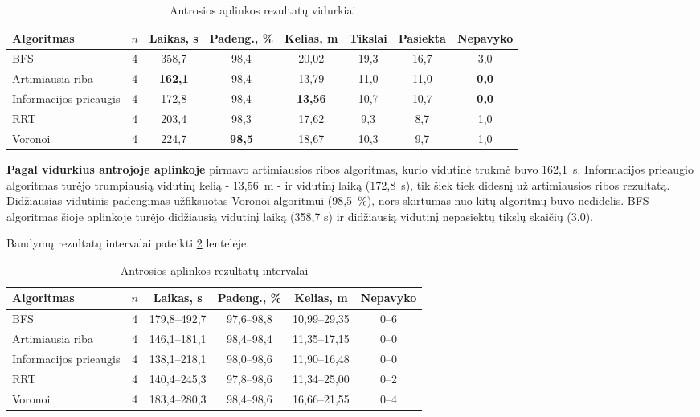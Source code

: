 \documentclass[]{VUMIFTemplateClass}
\begin{document}
\begin{table}[H]
\centering
\caption{Antrosios aplinkos rezultatų vidurkiai}
\label{tab:results-room2-avg}
\small
\setlength{\tabcolsep}{3pt}
\begin{tabular}{|l|c|c|c|c|c|c|c|}
\hline
\textbf{Algoritmas} & \textbf{$n$} & \textbf{Laikas, s} & \textbf{Padeng., \%} & \textbf{Kelias, m} & \textbf{Tikslai} & \textbf{Pasiekta} & \textbf{Nepavyko} \\
\hline
BFS & 4 & 358,7 & 98,4 & 20,02 & 19,3 & 16,7 & 3,0 \\
\hline
Artimiausia riba & 4 & \textbf{162,1} & 98,4 & 13,79 & 11,0 & 11,0 & \textbf{0,0} \\
\hline
Informacijos prieaugis & 4 & 172,8 & 98,4 & \textbf{13,56} & 10,7 & 10,7 & \textbf{0,0} \\
\hline
RRT & 4 & 203,4 & 98,3 & 17,62 & 9,3 & 8,7 & 1,0 \\
\hline
Voronoi & 4 & 224,7 & \textbf{98,5} & 18,67 & 10,3 & 9,7 & 1,0 \\
\hline
\end{tabular}
\end{table}

\textbf{Pagal vidurkius antrojoje aplinkoje} pirmavo artimiausios ribos algoritmas, kurio vidutinė trukmė buvo 162,1~s. Informacijos prieaugio algoritmas turėjo
trumpiausią vidutinį kelią - 13,56~m - ir vidutinį laiką (172,8~s), tik šiek tiek didesnį už artimiausios ribos rezultatą. Didžiausias vidutinis padengimas
užfiksuotas Voronoi algoritmui (98,5~\%), nors skirtumas nuo kitų algoritmų buvo nedidelis. BFS algoritmas šioje aplinkoje turėjo didžiausią vidutinį laiką (358,7 s) ir didžiausią vidutinį nepasiektų tikslų skaičių (3,0).

Bandymų rezultatų intervalai pateikti \ref{tab:results-room2-disp} lentelėje.

\begin{table}[H]
\centering
\caption{Antrosios aplinkos rezultatų intervalai}
\label{tab:results-room2-disp}
\small
\setlength{\tabcolsep}{3pt}
\begin{tabular}{|l|c|c|c|c|c|}
\hline
\textbf{Algoritmas} & \textbf{$n$} & \textbf{Laikas, s} & \textbf{Padeng., \%} & \textbf{Kelias, m} & \textbf{Nepavyko} \\
\hline
BFS & 4 & 179,8--492,7 & 97,6--98,8 & 10,99--29,35 & 0--6 \\
\hline
Artimiausia riba & 4 & 146,1--181,1 & 98,4--98,4 & 11,35--17,15 & 0--0 \\
\hline
Informacijos prieaugis & 4 & 138,1--218,1 & 98,0--98,6 & 11,90--16,48 & 0--0 \\
\hline
RRT & 4 & 140,4--245,3 & 97,8--98,6 & 11,34--25,00 & 0--2 \\
\hline
Voronoi & 4 & 183,4--280,3 & 98,4--98,6 & 16,66--21,55 & 0--4 \\
\hline
\end{tabular}
\end{table}
\end{document}
